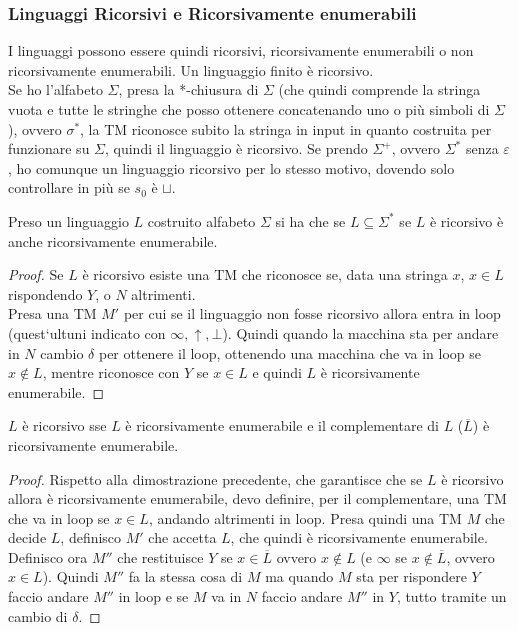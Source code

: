 \subsubsection{Linguaggi Ricorsivi e Ricorsivamente enumerabili}
I linguaggi possono essere quindi ricorsivi, ricorsivamente enumerabili o non
ricorsivamente enumerabili. Un linguaggio finito è ricorsivo.\\
Se ho l'alfabeto $\Sigma$, presa la *-chiusura
di $\Sigma$ (che quindi comprende la stringa vuota e tutte le stringhe che
posso ottenere concatenando uno o più simboli di $\Sigma$), ovvero $\sigma^*$,
la TM riconosce subito la stringa in input in quanto costruita per funzionare
su $\Sigma$, quindi il linguaggio è ricorsivo. Se prendo $\Sigma^+$, ovvero
$\Sigma^*$ senza $\varepsilon$, ho comunque un linguaggio ricorsivo per lo
stesso motivo, dovendo solo controllare in più se $s_0$ è $\sqcup$.
\begin{teorema}
  Preso un linguaggio $L$ costruito alfabeto $\Sigma$ si ha che
  se $L\subseteq\Sigma^*$ se $L$ è ricorsivo è anche ricorsivamente
  enumerabile.
  \begin{proof}
    Se $L$ è ricorsivo esiste una TM che riconosce se, data una stringa $x$,
    $x\in L$ rispondendo $Y$, o $N$ altrimenti.\\
    Presa una TM $M'$ per cui se il linguaggio non fosse ricorsivo allora entra
    in loop (quest`ultuni indicato con $\infty,\uparrow,\bot$). Quindi quando la macchina sta
    per andare in $N$ cambio $\delta$ per ottenere il loop, ottenendo una
    macchina che va in loop se $x\not\in L$, mentre riconosce con $Y$ se $x\in
    L$ e quindi $L$ è ricorsivamente enumerabile. 
  \end{proof}
\end{teorema}
\begin{teorema}
  $L$ è ricorsivo sse $L$ è ricorsivamente enumerabile e il complementare di
  $L$ ($\overline{L}$) è ricorsivamente enumerabile.
\end{teorema}
\begin{proof}
  Rispetto alla dimostrazione precedente, che garantisce che se $L$ è ricorsivo
  allora è ricorsivamente enumerabile, devo definire, per il complementare, una
  TM che va in loop se $x\in L$, andando altrimenti in loop. Presa quindi una TM
  $M$ che decide $L$, definisco $M'$ che accetta $L$, che quindi è
  ricorsivamente enumerabile. Definisco ora $M''$ che restituisce $Y$ se $x\in
  \overline{L}$ ovvero $x\not\in L$ (e $\infty$ se $x\not\in \overline{L}$,
  ovvero $x\in L$). Quindi $M''$ fa la stessa cosa di $M$ ma quando $M$ sta
  per rispondere $Y$ faccio andare $M''$ in loop e se $M$ va in $N$ faccio
  andare $M''$ in $Y$, tutto tramite un cambio di $\delta$.
\end{proof}
